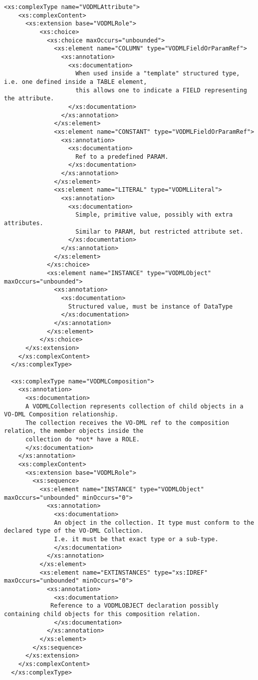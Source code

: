 \documentclass[11pt,a4paper]{ivoa}
\begin{document}
\begin{lstlisting}[label=lst:mapping,caption=VOTable schema extension for VO-DML mapping,frame=tb]
  <xs:complexType name="VODMLAttribute">
    <xs:complexContent>
      <xs:extension base="VODMLRole">
          <xs:choice>
            <xs:choice maxOccurs="unbounded">
              <xs:element name="COLUMN" type="VODMLFieldOrParamRef">
                <xs:annotation>
                  <xs:documentation>
                    When used inside a "template" structured type, i.e. one defined inside a TABLE element,
                    this allows one to indicate a FIELD representing the attribute.
                  </xs:documentation>
                </xs:annotation>
              </xs:element>
              <xs:element name="CONSTANT" type="VODMLFieldOrParamRef">
                <xs:annotation>
                  <xs:documentation>
                    Ref to a predefined PARAM.
                  </xs:documentation>
                </xs:annotation>
              </xs:element>
              <xs:element name="LITERAL" type="VODMLLiteral">
                <xs:annotation>
                  <xs:documentation>
                    Simple, primitive value, possibly with extra attributes.
                    Similar to PARAM, but restricted attribute set.
                  </xs:documentation>
                </xs:annotation>
              </xs:element>
            </xs:choice>
            <xs:element name="INSTANCE" type="VODMLObject" maxOccurs="unbounded">
              <xs:annotation>
                <xs:documentation>
                  Structured value, must be instance of DataType
                </xs:documentation>
              </xs:annotation>
            </xs:element>
          </xs:choice>
      </xs:extension>
    </xs:complexContent>
  </xs:complexType>

  <xs:complexType name="VODMLComposition">
    <xs:annotation>
      <xs:documentation>
      A VODMLCollection represents collection of child objects in a VO-DML Composition relationship.
      The collection receives the VO-DML ref to the composition relation, the member objects inside the 
      collection do *not* have a ROLE.
      </xs:documentation>
    </xs:annotation>
    <xs:complexContent>
      <xs:extension base="VODMLRole">
        <xs:sequence>
          <xs:element name="INSTANCE" type="VODMLObject" maxOccurs="unbounded" minOccurs="0">
            <xs:annotation>
              <xs:documentation>
              An object in the collection. It type must conform to the declared type of the VO-DML Collection.
              I.e. it must be that exact type or a sub-type.
              </xs:documentation>
            </xs:annotation>
          </xs:element>
          <xs:element name="EXTINSTANCES" type="xs:IDREF" maxOccurs="unbounded" minOccurs="0">
            <xs:annotation>
              <xs:documentation>
             Reference to a VODMLOBJECT declaration possibly containing child objects for this composition relation. 
              </xs:documentation>
            </xs:annotation>
          </xs:element>
        </xs:sequence>
      </xs:extension>
    </xs:complexContent>
  </xs:complexType>



\end{lstlisting}
\end{document}

